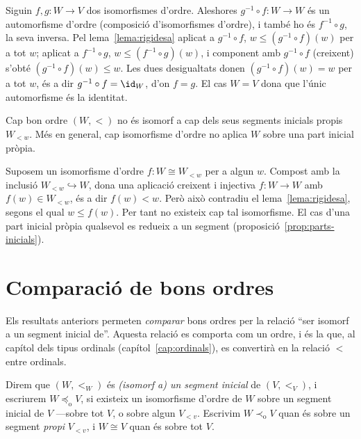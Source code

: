 \begin{prova}
Siguin \(f,g\colon W\to V\) dos isomorfismes d'ordre. Aleshores
\(g^{-1}\circ f\colon W\to W\) és un automorfisme d'ordre (composició
d'isomorfismes d'ordre), i també ho és \(f^{-1}\circ g\), la seva inversa.
Pel lema~\ref{lema:rigidesa} aplicat a \(g^{-1}\circ f\), \(w\le
(g^{-1}\circ f)(w)\) per a tot \(w\); aplicat a \(f^{-1}\circ g\),
\(w\le(f^{-1}\circ g)(w)\), i component amb \(g^{-1}\circ f\)
(creixent) s'obté \((g^{-1}\circ f)(w)\le w\). Les dues desigualtats donen
\((g^{-1}\circ f)(w)=w\) per a tot \(w\), és a dir \(g^{-1}\circ f=\id_W\),
d'on \(f=g\). El cas \(W=V\) dona que l'únic automorfisme és la identitat.
\end{prova}

\begin{corollari}\label{cor:no-segment-propi}
Cap bon ordre \((W,<)\) no és isomorf a cap dels seus segments inicials
propis \(W_{<w}\). Més en general, cap isomorfisme d'ordre no aplica \(W\)
sobre una part inicial pròpia.
\end{corollari}

\begin{prova}
Suposem un isomorfisme d'ordre \(f\colon W\cong W_{<w}\) per a algun \(w\).
Compost amb la inclusió \(W_{<w}\hookrightarrow W\), dona una aplicació
creixent i injectiva \(f\colon W\to W\) amb \(f(w)\in W_{<w}\), és a dir
\(f(w)<w\). Però això contradiu el lema~\ref{lema:rigidesa}, segons el qual
\(w\le f(w)\). Per tant no existeix cap tal isomorfisme. El cas d'una part
inicial pròpia qualsevol es redueix a un segment
(proposició~\ref{prop:parts-inicials}).
\end{prova}

\section{Comparació de bons ordres}\label{sec:comparacio-bons-ordres}

Els resultats anteriors permeten \emph{comparar} bons ordres per la relació
\enquote{ser isomorf a un segment inicial de}. Aquesta relació es comporta
com un ordre, i és la que, al capítol dels tipus ordinals
(capítol~\ref{cap:ordinals}), es convertirà en la relació \(<\) entre ordinals.

\begin{definicio}\label{def:mes-curt}
Direm que \((W,<_W)\) és \emph{(isomorf a) un segment inicial} de
\((V,<_V)\), i escriurem \(W\preceq_{\mathrm o} V\), si existeix un
isomorfisme d'ordre de \(W\) sobre un segment inicial de \(V\) ---sobre tot
\(V\), o sobre algun \(V_{<v}\). Escrivim \(W\prec_{\mathrm o}V\) quan és
sobre un segment \emph{propi} \(V_{<v}\), i \(W\cong V\) quan és sobre tot
\(V\).
\end{definicio}

